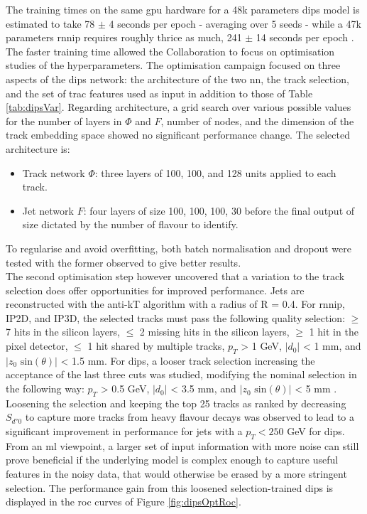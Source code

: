 The training times on the same \gls{gpu} hardware for a 48k parameters \gls{dips} model is estimated to take 78 $\pm$ 4 seconds per epoch - averaging over 5 seeds - while a 47k parameters \gls{rnnip} requires roughly thrice as much, 241 $\pm$ 14 seconds per epoch \cite{ATL-PHYS-PUB-2020-014}. The faster training time allowed the Collaboration to focus on optimisation studies of the hyperparameters. The optimisation campaign focused on three aspects of the \gls{dips} network: the architecture of the two \gls{nn}, the track selection, and the set of trac features used as input in addition to those of Table \ref{tab:dipsVar}. Regarding architecture, a grid search over various possible values for the number of layers in $\Phi$ and $F$, number of nodes, and the dimension of the track embedding space showed no significant performance change. The selected architecture is:
\begin{itemize}
  \item Track network $\Phi$: three layers of 100, 100, and 128 units applied to each track. 
  \item Jet network $F$: four layers of size 100, 100, 100, 30 before the final output of size dictated by the number of flavour to identify. 
\end{itemize}
To regularise and avoid overfitting, both batch normalisation and dropout were tested with the former observed to give better results. \\ 

The second optimisation step however uncovered that a variation to the track selection does offer opportunities for improved performance. Jets are reconstructed with the anti-kT algorithm with a radius of R = 0.4. For \gls{rnnip}, IP2D, and IP3D, the selected tracks must pass the following quality selection: $\geq$ 7 hits in the silicon layers, $\leq$ 2 missing hits in the silicon layers, $\geq$ 1 hit in the pixel detector, $\leq$ 1 hit shared by multiple tracks, $p_T$ > 1 GeV, $|d_0|$ < 1 mm, and $|z_0 \textrm{ sin}(\theta)|$ < 1.5 mm. For \gls{dips}, a looser track selection increasing the acceptance of the last three cuts was studied, modifying the nominal selection in the following way: $p_T$ > 0.5 GeV, $|d_0|$ < 3.5 mm, and $|z_0 \textrm{ sin}(\theta)|$ < 5 mm \cite{ATL-PHYS-PUB-2020-014}. Loosening the selection and keeping the top 25 tracks as ranked by decreasing $S_{d°0}$ to capture more tracks from heavy flavour decays was observed to lead to a significant improvement in performance for jets with a $p_T < 250$ GeV for \gls{dips}. From an \gls{ml} viewpoint, a larger set of input information with more noise can still prove beneficial if the underlying model is complex enough to capture useful features in the noisy data, that would otherwise be erased by a more stringent selection. The performance gain from this loosened selection-trained \gls{dips} is displayed in the \gls{roc} curves of Figure \ref{fig:dipsOptRoc}. \\

